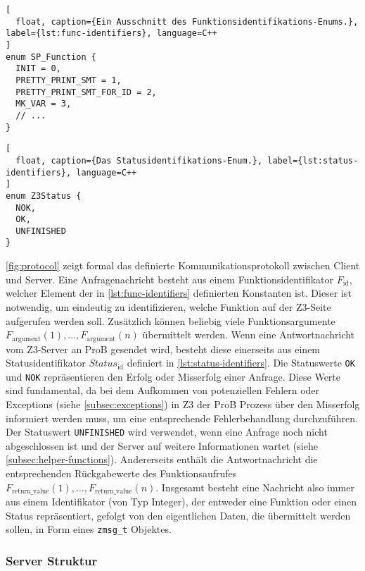 \begin{lstlisting}[
  float, caption={Ein Ausschnitt des Funktionsidentifikations-Enums.}, label={lst:func-identifiers}, language=C++
]
enum SP_Function {
  INIT = 0,
  PRETTY_PRINT_SMT = 1,
  PRETTY_PRINT_SMT_FOR_ID = 2,
  MK_VAR = 3,
  // ...
}
\end{lstlisting}

\begin{lstlisting}[
  float, caption={Das Statusidentifikations-Enum.}, label={lst:status-identifiers}, language=C++
]
enum Z3Status {
  NOK,
  OK,
  UNFINISHED
}
\end{lstlisting}

\cref{fig:protocol} zeigt formal das definierte Kommunikationsprotokoll zwischen Client und Server.
Eine Anfragenachricht besteht aus einem Funktionsidentifikator $F_\text{id}$, welcher Element der in \cref{lst:func-identifiers} definierten Konstanten ist.
Dieser ist notwendig, um eindeutig zu identifizieren, welche Funktion auf der Z3-Seite aufgerufen werden soll.
Zusätzlich können beliebig viele Funktionsargumente $F_\text{argument}(1), \ldots, F_\text{argument}(n)$ übermittelt werden.
Wenn eine Antwortnachricht vom Z3-Server an ProB gesendet wird, besteht diese einerseits aus einem Statusidentifikator $Status_\text{id}$ definiert in \cref{lst:status-identifiers}.
Die Statuswerte \texttt{OK} und \texttt{NOK} repräsentieren den Erfolg oder Misserfolg einer Anfrage.
Diese Werte sind fundamental, da bei dem Aufkommen von potenziellen Fehlern oder Exceptions (siehe \cref{subsec:exceptions}) in Z3 der ProB Prozess über den Misserfolg informiert werden muss,
um eine entsprechende Fehlerbehandlung durchzuführen.
Der Statuswert \texttt{UNFINISHED} wird verwendet, wenn eine Anfrage noch nicht abgeschlossen ist und der Server auf weitere Informationen wartet (siehe \cref{subsec:helper-functions}).
Andererseits enthält die Antwortnachricht die entsprechenden Rückgabewerte des Funktionsaufrufes $F_\text{return\_value}(1), \ldots, F_\text{return\_value}(n)$.
Insgesamt besteht eine Nachricht also immer aus einem Identifikator (von Typ Integer), der entweder eine Funktion oder einen Status repräsentiert,
gefolgt von den eigentlichen Daten, die übermittelt werden sollen, in Form eines \texttt{zmsg\_t} Objektes.

\subsubsection{Server Struktur}

